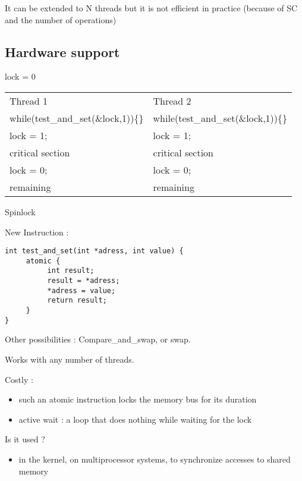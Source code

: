 It can be extended to N threads but it is not efficient in practice (because of SC and the number of operations)

\subsection{Hardware support}

\begin{centering}

lock = 0

\begin{tabular}{|ll|}
\hline
	Thread 1 & Thread 2 \\
	while(test\_and\_set(\&lock,1))\{\} & while(test\_and\_set(\&lock,1))\{\}\\
	lock = 1; & lock = 1; \\
	critical section & critical section\\
	lock = 0; & lock = 0; \\
	remaining & remaining\\
\hline
\end{tabular}

Spinlock

\end{centering}

New Instruction :

\begin{verbatim}
int test_and_set(int *adress, int value) {
     atomic {
          int result;
          result = *adress;
          *adress = value;
          return result;
     }
}
\end{verbatim}

Other possibilities : Compare\_and\_swap, or swap.
 
Works with any number of threads.

Costly :

\begin{itemize}
\item such an atomic instruction locks the memory bus for its duration
\item active wait : a loop that does nothing while waiting for the lock
\end{itemize}

Is it used ?
\begin{itemize}
\item in the kernel, on multiprocessor systems, to synchronize accesses to shared memory
\end{itemize}

